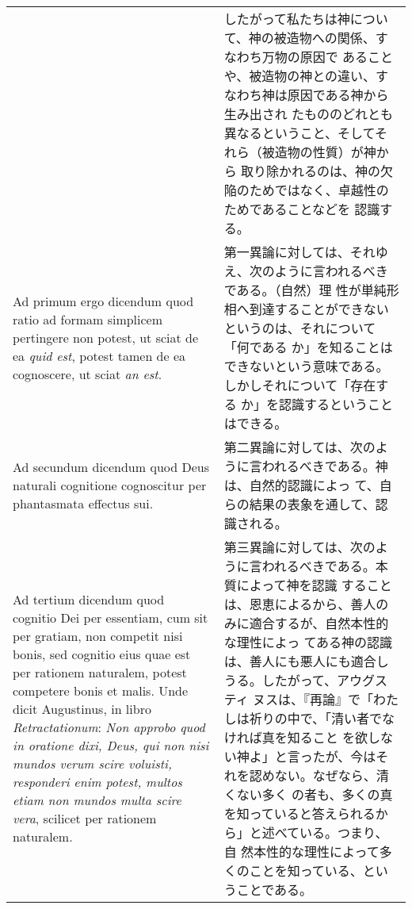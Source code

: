 \documentclass[10pt]{jsarticle} %
\begin{document}
\begin{longtable}{p{21em}p{21em}}
&

したがって私たちは神について、神の被造物への関係、すなわち万物の原因で
あることや、被造物の神との違い、すなわち神は原因である神から生み出され
たもののどれとも異なるということ、そしてそれら（被造物の性質）が神から
取り除かれるのは、神の欠陥のためではなく、卓越性のためであることなどを
認識する。

\\

{\sc Ad primum ergo dicendum} quod ratio ad formam simplicem
pertingere non potest, ut sciat de ea {\it quid est}, potest tamen de
ea cognoscere, ut sciat {\it an est}.

&

第一異論に対しては、それゆえ、次のように言われるべきである。（自然）理
性が単純形相へ到達することができないというのは、それについて「何である
か」を知ることはできないという意味である。しかしそれについて「存在する
か」を認識するということはできる。

\\

{\sc Ad secundum dicendum} quod Deus naturali cognitione cognoscitur
per phantasmata effectus sui.

&

第二異論に対しては、次のように言われるべきである。神は、自然的認識によっ
て、自らの結果の表象を通して、認識される。

\\

{\sc Ad tertium dicendum} quod cognitio Dei per essentiam, cum sit per
gratiam, non competit nisi bonis, sed cognitio eius quae est per
rationem naturalem, potest competere bonis et malis. Unde dicit
Augustinus, in libro {\it Retractationum}: {\it Non approbo quod in
oratione dixi, Deus, qui non nisi mundos verum scire voluisti,
responderi enim potest, multos etiam non mundos multa scire vera},
scilicet per rationem naturalem.

&

第三異論に対しては、次のように言われるべきである。本質によって神を認識
することは、恩恵によるから、善人のみに適合するが、自然本性的な理性によっ
てある神の認識は、善人にも悪人にも適合しうる。したがって、アウグスティ
ヌスは、『再論』で「わたしは祈りの中で、「清い者でなければ真を知ること
を欲しない神よ」と言ったが、今はそれを認めない。なぜなら、清くない多く
の者も、多くの真を知っていると答えられるから」と述べている。つまり、自
然本性的な理性によって多くのことを知っている、ということである。

\end{longtable}
\end{document}
